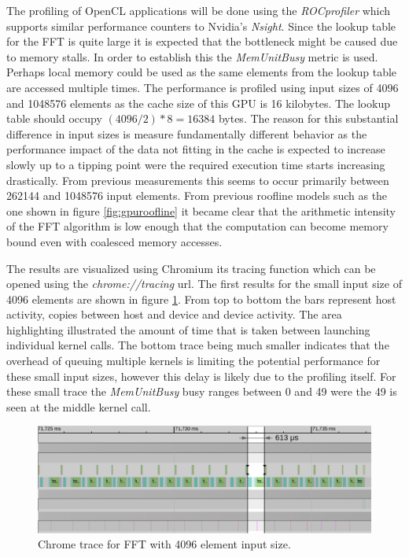 \documentclass[conference]{IEEEtran}
\begin{document}
The profiling of OpenCL applications will be done using the
\textit{ROCprofiler} which supports similar performance counters to Nvidia's
\textit{Nsight}. Since the lookup table for the FFT is quite large it is
expected that the bottleneck might be caused due to memory stalls. In order
to establish this the \textit{MemUnitBusy} metric is used. Perhaps local 
memory could be used as the same elements from the lookup table are accessed
multiple times. The performance is profiled using input sizes of 4096 and
1048576 elements as the cache size of this GPU is 16 kilobytes. The lookup
table should occupy $(4096/2)*8=16384$ bytes. The reason for this substantial
difference in input sizes is measure fundamentally different behavior as the
performance impact of the data not fitting in the cache is expected to increase
slowly up to a tipping point were the required execution time starts increasing
drastically. From previous measurements this seems to occur primarily between
262144 and 1048576 input elements. From previous roofline models such as the
one shown in figure \ref{fig:gpuroofline} it became clear that the arithmetic
intensity of the FFT algorithm is low enough that the computation can become
memory bound even with coalesced memory accesses.

The results are visualized using Chromium its tracing function which can be
opened using the \textit{chrome://tracing} url. The first results for the
small input size of 4096 elements are shown in figure \ref{fig:tracesmall}.
From top to bottom the bars represent host activity, copies between host and
device and device activity. The area highlighting illustrated the amount of
time that is taken between launching individual kernel calls. The bottom trace
being much smaller indicates that the overhead of queuing multiple kernels is
limiting the potential performance for these small input sizes, however this
delay is likely due to the profiling itself. For these small trace the
\textit{MemUnitBusy} busy ranges between 0 and 49 were the 49 is seen at the
middle kernel call.

\begin{figure}[H]
	\centering
	\includegraphics[width=1\linewidth]{resources/images/trace-4096.png}
	\caption{Chrome trace for FFT with 4096 element input size.}
	\label{fig:tracesmall}
\end{figure}
\end{document}
